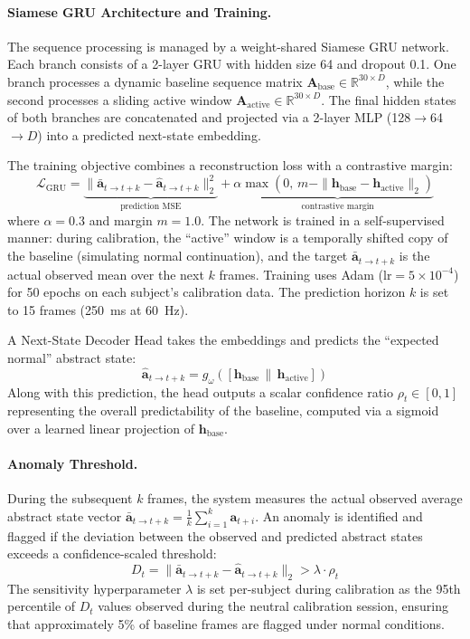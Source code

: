 \documentclass[sigconf]{acmart}
\begin{document}
\paragraph{Siamese GRU Architecture and Training.}
The sequence processing is managed by a weight-shared Siamese GRU network. Each branch consists of a 2-layer GRU with hidden size 64 and dropout 0.1. One branch processes a dynamic baseline sequence matrix $\mathbf{A}_{\text{base}} \in \mathbb{R}^{30 \times D}$, while the second processes a sliding active window $\mathbf{A}_{\text{active}} \in \mathbb{R}^{30 \times D}$. The final hidden states of both branches are concatenated and projected via a 2-layer MLP (128$\to$64$\to D$) into a predicted next-state embedding.

The training objective combines a reconstruction loss with a contrastive margin:
$$\mathcal{L}_{\text{GRU}} = \underbrace{\|\bar{\mathbf{a}}_{t \to t+k} - \hat{\mathbf{a}}_{t \to t+k}\|_2^2}_{\text{prediction MSE}} + \alpha \underbrace{\max(0, \, m - \|\mathbf{h}_{\text{base}} - \mathbf{h}_{\text{active}}\|_2)}_{\text{contrastive margin}}$$
where $\alpha = 0.3$ and margin $m = 1.0$. The network is trained in a self-supervised manner: during calibration, the ``active'' window is a temporally shifted copy of the baseline (simulating normal continuation), and the target $\bar{\mathbf{a}}_{t \to t+k}$ is the actual observed mean over the next $k$ frames. Training uses Adam ($\text{lr}=5 \times 10^{-4}$) for 50 epochs on each subject's calibration data. The prediction horizon $k$ is set to 15 frames (250~ms at 60~Hz).

A Next-State Decoder Head takes the embeddings and predicts the ``expected normal'' abstract state:
$$\hat{\mathbf{a}}_{t \to t+k} = g_{\omega}([\mathbf{h}_{\text{base}} \,\|\, \mathbf{h}_{\text{active}}])$$
Along with this prediction, the head outputs a scalar confidence ratio $\rho_t \in [0, 1]$ representing the overall predictability of the baseline, computed via a sigmoid over a learned linear projection of $\mathbf{h}_{\text{base}}$.

\paragraph{Anomaly Threshold.}
During the subsequent $k$ frames, the system measures the actual observed average abstract state vector $\bar{\mathbf{a}}_{t \to t+k} = \frac{1}{k}\sum_{i=1}^{k} \mathbf{a}_{t+i}$. An anomaly is identified and flagged if the deviation between the observed and predicted abstract states exceeds a confidence-scaled threshold:
$$D_t = \|\bar{\mathbf{a}}_{t \to t+k} - \hat{\mathbf{a}}_{t \to t+k}\|_2 > \lambda \cdot \rho_t$$
The sensitivity hyperparameter $\lambda$ is set per-subject during calibration as the 95th percentile of $D_t$ values observed during the neutral calibration session, ensuring that approximately 5\% of baseline frames are flagged under normal conditions.
\end{document}
